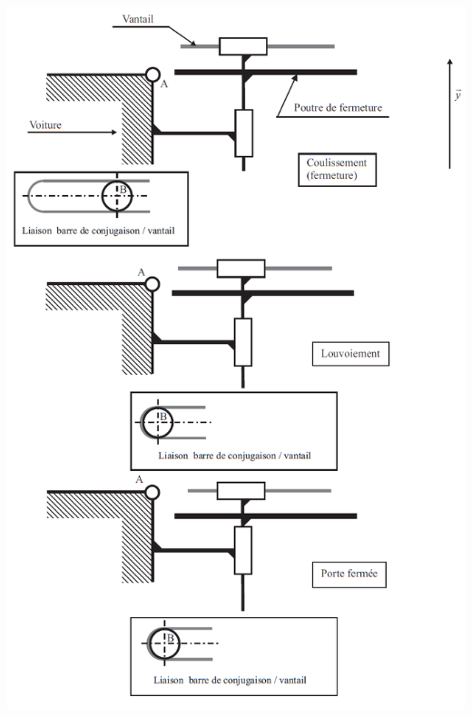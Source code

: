 \newpage




\newpage


\begin{center}
 \includegraphics[width=0.8\linewidth]{img/DR3}
\end{center}

\newpage







\newpage



